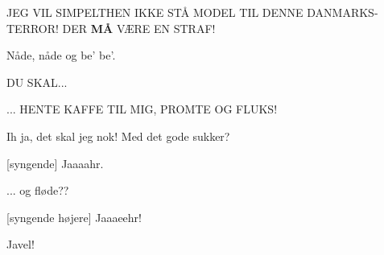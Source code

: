 \documentclass[a4paper,11pt]{article}
\begin{document}
\begin{sketch}
 JEG VIL SIMPELTHEN IKKE STÅ MODEL TIL DENNE DANMARKS-TERROR!  DER
\textbf{MÅ} VÆRE EN STRAF!

 Nåde, nåde og be' be'.


 DU SKAL...

 ... HENTE KAFFE TIL MIG, PROMTE OG FLUKS!


 Ih ja, det skal jeg nok!  Med det gode sukker?

[syngende] Jaaaahr.

 ... og fløde??

[syngende højere] Jaaaeehr!

 Javel! 



\end{sketch}
\end{document}

